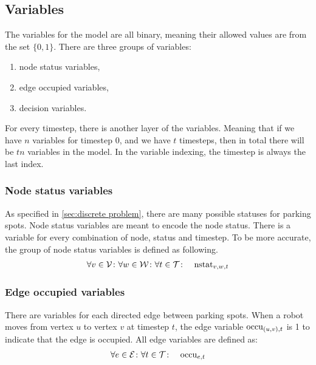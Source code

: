 \subsection{Variables}
\label{sec:variables}
The variables for the model are all binary, meaning their allowed values are from the set
$\{0,1\}$. There are three groups of variables:
\begin{enumerate}
    \item node status variables,
    \item edge occupied variables,
    \item decision variables.
\end{enumerate}
For every timestep, there is another layer of the variables. Meaning that if
we have $n$ variables for timestep $0$, and we have $t$ timesteps, then in total
there will be $tn$ variables in the model. In the variable indexing, the
timestep is always the last index.

\subsubsection{Node status variables}
As specified in \autoref{sec:discrete problem}, there are many possible statuses
for parking spots. Node status variables are meant to encode the node status.
There is a variable for every combination of node, status and timestep. To be
more accurate, the group of node status variables is defined as following.
\begin{align}
    &\forall v \in \mathcal{V} \colon \forall w \in \mathcal{W} \colon \forall t \in \mathcal{T} \colon &
    \mathrm{nstat}_{v,w,t}
\end{align}

\subsubsection{Edge occupied variables}
There are variables for each directed edge between parking spots. When a robot
moves from vertex $u$ to vertex $v$ at timestep $t$, the edge variable
$\mathrm{occu}_{(u,v),t}$ is 1 to indicate that the edge is occupied. All edge variables
are defined as:
\begin{align}
    &\forall e \in \mathcal{E} \colon \forall t \in \mathcal{T} \colon & \mathrm{occu}_{e,t}
\end{align}

